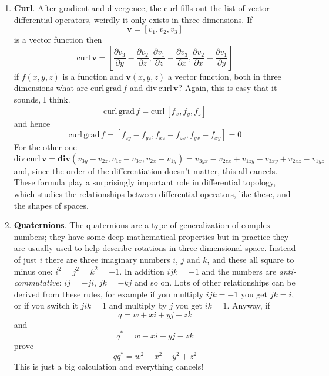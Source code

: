 \documentclass[11pt,a4paper]{scrartcl}
\begin{document}
\begin{enumerate}
 \item \textbf{Curl}. After gradient and divergence, the curl fills out the list of vector differential operators, weirdly it only exists in three dimensions. If 
\begin{equation}
    \mathbf{v}=[v_1,v_2,v_3]
  \end{equation}
is a vector function then
\begin{equation}
    \textrm{curl}\,\mathbf{v}=\left[\frac{\partial v_3}{\partial y}-\frac{\partial v_2}{\partial z},\frac{\partial v_1}{\partial z}-\frac{\partial v_3}{\partial x},\frac{\partial v_2}{\partial x}-\frac{\partial v_1}{\partial y}\right]
  \end{equation}
if $f(x,y,z)$ is a function and $\textbf{v}(x,y,z)$ a vector function, both in three dimensions what are $\textrm{curl}\,\textrm{grad}\,f$ and $\textrm{div}\,\textrm{curl}\,\textbf{v}$? Again, this is easy that it sounds, I think.
\begin{equation}
  \textrm{curl}\,\textrm{grad}\,f=\textrm{curl}\,[f_x,f_y,f_z]
\end{equation}
and hence
\begin{equation}
  \textrm{curl}\,\textrm{grad}\,f=[f_{zy}-f_{yz},f_{xz}-f_{zx},f_{yx}-f_{xy}]=\mathrm{0}
\end{equation}
For the other one
\begin{equation}
  \textrm{div}\,\textrm{curl}\,\textbf{v}=\textbf{div}(v_{3y}-v_{2z},v_{1z}-v_{3x},v_{2x}-v_{1y})=v_{3yx}-v_{2zx}+v_{1zy}-v_{3xy}+v_{2xz}-v_{1yz}
\end{equation}
and, since the order of the differentiation doesn't matter, this all cancels. These formula play a surprisingly important role in differential topology, which studies the relationships between differential operators, like these, and the shapes of spaces.

\item \textbf{Quaternions}. The quaternions are a type of generalization of complex numbers; they have some deep mathematical properties but in practice they are usually used to help describe rotations in three-dimensional space. Instead of just $i$ there are three imaginary numbers $i$, $j$ and $k$, and these all square to minus one: $i^2=j^2=k^2=-1$. In addition $ijk=-1$ and the numbers are \textsl{anti-commutative}: $ij=-ji$, $jk=-kj$ and so on. Lots of other relationships can be derived from these rules, for example if you multiply $ijk=-1$ you get $jk=i$, or if you switch it $jik=1$ and multiply by $j$ you get $ik=1$. Anyway, if
  \begin{equation}
    q=w+xi+yj+zk
  \end{equation}
  and
  \begin{equation}
    q^*=w-xi-yj-zk
  \end{equation}
  prove
  \begin{equation}
    qq^*=w^2+x^2+y^2+z^2
  \end{equation}
 This is just a big calculation and everything cancels! 
        
\end{enumerate}
\end{document}

